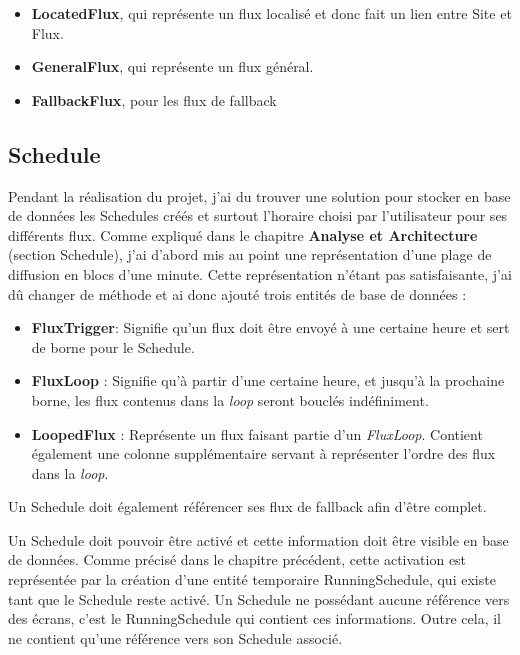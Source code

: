 \documentclass[french]{article}
\begin{document}
\begin{itemize}
	\item \textbf{LocatedFlux}, qui représente un flux localisé et donc fait un lien entre Site et Flux.
	\item \textbf{GeneralFlux}, qui représente un flux général.
	\item \textbf{FallbackFlux}, pour les flux de fallback
\end{itemize}

\subsection{Schedule}

Pendant la réalisation du projet, j'ai du trouver une solution pour stocker en base de données les Schedules créés et surtout l'horaire choisi par l'utilisateur pour ses différents flux. Comme expliqué dans le chapitre \textbf{Analyse et Architecture} (section Schedule), j'ai d'abord mis au point une représentation d'une plage de diffusion en blocs d'une minute. Cette représentation n'étant pas satisfaisante, j'ai dû changer de méthode et ai donc ajouté trois entités de base de données : 
\begin{itemize}
	\item \textbf{FluxTrigger}: Signifie qu'un flux doit être envoyé à une certaine heure et sert de borne pour le Schedule.
	\item \textbf{FluxLoop} : Signifie qu'à partir d'une certaine heure, et jusqu'à la prochaine borne, les flux contenus dans la \textit{loop} seront bouclés indéfiniment. 
	\item \textbf{LoopedFlux} : Représente un flux faisant partie d'un \textit{FluxLoop}. Contient également une colonne supplémentaire servant à représenter l'ordre des flux dans la \textit{loop}.\newline
\end{itemize}   
Un Schedule doit également référencer ses flux de fallback afin d'être complet.\newline

Un Schedule doit pouvoir être activé et cette information doit être visible en base de données. Comme précisé dans le chapitre précédent, cette activation est représentée par la création d'une entité temporaire RunningSchedule, qui existe tant que le Schedule reste activé. Un Schedule ne possédant aucune référence vers des écrans, c'est le RunningSchedule qui contient ces informations. Outre cela, il ne contient qu'une référence vers son Schedule associé. \newline
\end{document}
